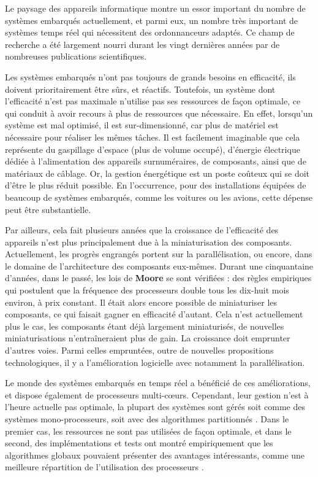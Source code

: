 \documentclass[11pt,a4paper,oneside]{report}
\newcommand{\customhighlight}[1]{{\textbf{#1}}}
\begin{document}
	Le paysage des appareils informatique montre un essor important du nombre de systèmes 
	embarqués actuellement, et
	parmi eux, un nombre très important de systèmes temps réel qui 
	nécessitent des ordonnanceurs adaptés. 
	Ce champ de recherche a été largement nourri durant les vingt dernières années par de nombreuses publications scientifiques. \medskip
	
	Les systèmes embarqués n'ont pas toujours de grands besoins en efficacité, 
	ils doivent prioritairement être sûrs, et réactifs. 
	Toutefois, un système dont l'efficacité n'est pas maximale n'utilise pas 
	ses ressources de façon optimale, ce qui conduit à avoir recours à 
	plus de ressources que nécessaire. En effet, lorsqu'un système est 
	mal optimisé, il est sur-dimensionné, car plus de matériel est nécessaire 
	pour réaliser les mêmes tâches. Il est facilement imaginable que cela représente du 
	gaspillage d'espace (plus de volume occupé), 
	d'énergie électrique dédiée à l'alimentation des appareils surnuméraires, 
	de composants, ainsi que de matériaux de câblage.
	Or, la gestion énergétique 
	est un poste coûteux qui se doit d'être le plus réduit possible. 
	En l'occurrence, pour des installations équipées de beaucoup de systèmes embarqués, 
	comme les voitures ou les avions, cette dépense peut être substantielle. \medskip
	
	Par ailleurs, cela fait plusieurs années que la croissance de l'efficacité des 
	appareils n'est plus principalement due à la miniaturisation des composants. 
	Actuellement, les progrès engrangés portent sur la parallélisation, 
	ou encore, dans le domaine de l'architecture des composants eux-mêmes.
	Durant une cinquantaine d'années, dans le passé, les lois de \customhighlight{Moore}
	se sont vérifiées : des règles empiriques qui postulent que la fréquence des processeurs 
	double tous les dix-huit mois environ, à prix constant. 
	Il était alors encore possible de miniaturiser les composants, 
	ce qui faisait gagner en efficacité d'autant. 
	Cela n'est actuellement plus le cas, 
	les composants étant déjà largement miniaturisés, de nouvelles miniaturisations 
	n'entraîneraient plus de gain. La croissance doit emprunter d'autres voies. Parmi celles 
	empruntées, outre de nouvelles propositions technologiques, 
	il y a l'amélioration logicielle avec notamment la parallélisation.
	\medskip
	
	Le monde des systèmes embarqués en temps réel a bénéficié de ces améliorations, 
	et dispose également de processeurs multi-c\oe{}urs. Cependant, leur gestion n'est 
	à l'heure actuelle pas optimale, la plupart des systèmes sont  
	gérés soit comme des systèmes mono-processeurs, soit avec des algorithmes partitionnés \cite{paolillo_new_nodate}. 
	Dans le premier cas, les ressources ne sont pas utilisées de façon optimale, 
	et dans le second, des implémentations et tests ont montré empiriquement 
	que les algorithmes globaux pouvaient présenter des avantages intéressants, comme 
	une meilleure répartition de l'utilisation des processeurs \cite{baker_analysis_2005}. 
	\medskip
	
\end{document}
